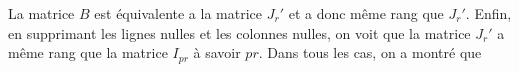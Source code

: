 {{La matrice $B$ est équivalente a la matrice $J_r'$ et a donc même rang que $J_r'$. Enfin, en supprimant les lignes nulles et les colonnes nulles, on voit que la matrice $J_r'$ a même rang que la matrice $I_{pr}$ à savoir $pr$. Dans tous les cas, on a montré que  

\begin{center}
\end{center}
}
}
